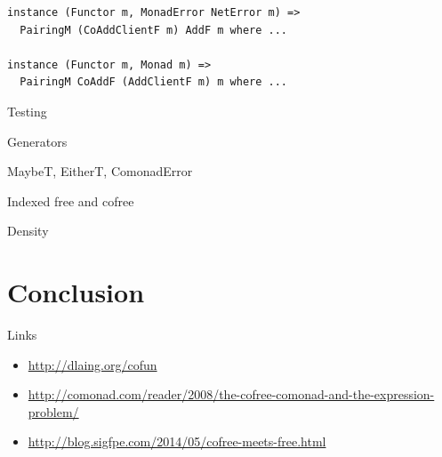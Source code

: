 \documentclass{beamer}
\begin{document}
\begin{frame}[fragile]
  \begin{verbatim}
instance (Functor m, MonadError NetError m) =>
  PairingM (CoAddClientF m) AddF m where ...

instance (Functor m, Monad m) =>
  PairingM CoAddF (AddClientF m) m where ...
  \end{verbatim}
\end{frame}

\begin{frame}[c]
  \centering
  Testing
\end{frame}

\begin{frame}[c]
  \centering
  Generators
\end{frame}

\begin{frame}[c]
  \centering
  MaybeT, EitherT, ComonadError
\end{frame}

\begin{frame}[c]
  \centering
  Indexed free and cofree
\end{frame}

\begin{frame}[c]
  \centering
  Density
\end{frame}

\section{Conclusion}

\begin{frame}[c]
  \centering
  Links
  \begin{itemize}
  \item<1-> \href{http://dlaing.org/cofun}{http://dlaing.org/cofun}
  \item<2-> \href{http://comonad.com/reader/2008/the-cofree-comonad-and-the-expression-problem/}{http://comonad.com/reader/2008/the-cofree-comonad-and-the-expression-problem/}
  \item<3-> \href{http://blog.sigfpe.com/2014/05/cofree-meets-free.html}{http://blog.sigfpe.com/2014/05/cofree-meets-free.html}
  \end{itemize}
\end{frame}
\end{document}
